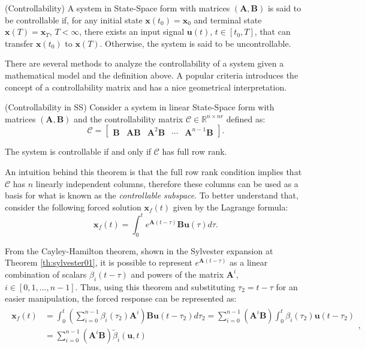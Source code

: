 \documentclass[a4paper,11pt]{book}
\numberwithin{figure}{chapter}
\numberwithin{equation}{chapter}
\numberwithin{table}{chapter}
\newtheorem{theorem}{Theorem}[chapter]
\theoremstyle{definition}
\newtheorem{definition}{Definition}[chapter]
\newcounter{boxed-theorem}
\newenvironment{boxed-theorem}[1]
{\begin{shaded} \begin{theorem}{#1}}
{\end{theorem} \end{shaded}}
\newcounter{boxed-definition}
\newenvironment{boxed-definition}[1]
{\begin{shaded} \begin{definition}{#1}}
{\end{definition} \end{shaded}}
\begin{document}
\begin{boxed-definition}{(Controllability)}
    A system in State-Space form with matrices $(\bm{A}, \bm{B})$ is said to be controllable if, for any initial state $\bm{x}(t_0) = \bm{x}_0$ and terminal state $\bm{x}(T) = \bm{x}_T$, $T < \infty$, there exists an input signal $\bm{u}(t)$, $t \in [t_0, T]$, that can transfer $\bm{x}(t_0)$ to $\bm{x}(T)$. Otherwise, the system is said to be uncontrollable. 
\end{boxed-definition}

There are several methods to analyze the controllability of a system given a mathematical model and the definition above. A popular criteria introduces the concept of a controllability matrix and has a nice geometrical interpretation.

\begin{boxed-theorem}{(Controllability in SS)}
    Consider a system in linear State-Space form with matrices $(\bm{A}, \bm{B})$ and the controllability matrix $\bm{\mathcal{C}} \in \mathbb{R}^{n \times nr}$ defined as:
    \begin{equation}
        \bm{\mathcal{C}} = \begin{bmatrix} \bm{B} & \bm{A} \bm{B} & \bm{A}^2 \bm{B} & \cdots & \bm{A}^{n-1} \bm{B} \end{bmatrix}
    .\end{equation}
    
    The system is controllable if and only if $\bm{\mathcal{C}}$ has full row rank.
\end{boxed-theorem}   

An intuition behind this theorem is that the full row rank condition implies that $\mathcal{C}$ has $n$ linearly independent columns, therefore these columns can be used as a basis for what is known as the \textit{controllable subspace}. To better understand that, consider the following forced solution $\bm{x}_f(t)$ given by the Lagrange formula:
\begin{equation}
    \bm{x}_f(t) = \int_{0}^{t} e^{\bm{A} (t-\tau)} \bm{B} \bm{u}(\tau) d\tau
.\end{equation}

From the Cayley-Hamilton theorem, shown in the Sylvester expansion at Theorem \ref{th:sylvester01}, it is possible to represent $e^{\bm{A}(t-\tau)}$ as a linear combination of scalars $\beta_i(t-\tau)$ and powers of the matrix $\bm{A}^i$, $i \in [0, 1,..., n-1]$. Thus, using this theorem and substituting $\tau_2 = t - \tau$ for an easier manipulation, the forced response can be represented as:
\begin{align}
\begin{split}
    \bm{x}_f(t) &= \int_{0}^{t} \left( \sum_{i=0}^{n-1} \beta_i(\tau_2) \bm{A}^i \right) \bm{B} \bm{u}(t - \tau_2) d\tau_2 = \sum_{i=0}^{n-1} \left( \bm{A}^i \bm{B} \right) \int_{0}^{t} \beta_i(\tau_2) \bm{u}(t - \tau_2)  \\
        &= \sum_{i=0}^{n-1} \left( \bm{A}^i \bm{B} \right) \tilde{\beta}_i(\bm{u}, t)
\end{split}
,\end{align}
\end{document}
